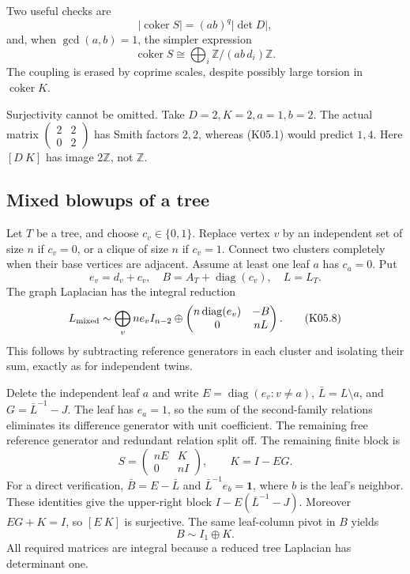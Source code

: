 \documentclass[11pt,a4paper]{article}
\theoremstyle{definition}\newtheorem{definition}[theorem]{Definition}
\theoremstyle{remark}\newtheorem{remark}[theorem]{Remark}
\newcommand{\Z}{\mathbb Z}\newcommand{\Q}{\mathbb Q}\newcommand{\F}{\mathbb F}
\DeclareMathOperator{\coker}{coker}\DeclareMathOperator{\diag}{diag}\DeclareMathOperator{\rank}{rank}
\numberwithin{equation}{section}
\begin{document}
Two useful checks are
\[
 |\coker S|=(ab)^q|\det D|,
\]
and, when $\gcd(a,b)=1$, the simpler expression
\[
 \coker S\cong\bigoplus_i\Z/(ab\,d_i)\Z.                    \tag{K05.7}
\]
The coupling is erased by coprime scales, despite possibly large torsion in $\coker K$.

Surjectivity cannot be omitted. Take $D=2,K=2,a=1,b=2$. The actual matrix $\left(\begin{smallmatrix}2&2\\0&2\end{smallmatrix}\right)$ has Smith factors $2,2$, whereas (K05.1) would predict $1,4$. Here $[D\ K]$ has image $2\Z$, not $\Z$.

\subsection{Mixed blowups of a tree}\label{K05-sec-4}
Let $T$ be a tree, and choose $c_v\in\{0,1\}$. Replace vertex $v$ by an independent set of size $n$ if $c_v=0$, or a clique of size $n$ if $c_v=1$. Connect two clusters completely when their base vertices are adjacent. Assume at least one leaf $a$ has $c_a=0$. Put
\[
 e_v=d_v+c_v,\quad B=A_T+\diag(c_v),\quad L=L_T.
\]
The graph Laplacian has the integral reduction
\[
 L_{\rm mixed}\sim\bigoplus_v ne_vI_{n-2}\oplus
 \begin{pmatrix}n\diag(e_v)&-B\\0&nL\end{pmatrix}.             \tag{K05.8}
\]
This follows by subtracting reference generators in each cluster and isolating their sum, exactly as for independent twins.

Delete the independent leaf $a$ and write $E=\diag(e_v:v\ne a)$, $\bar L=L\setminus a$, and $G=\bar L^{-1}-J$. The leaf has $e_a=1$, so the sum of the second-family relations eliminates its difference generator with unit coefficient. The remaining free reference generator and redundant relation split off. The remaining finite block is
\[
 S=\begin{pmatrix}nE&K\\0&nI\end{pmatrix},\qquad K=I-EG.     \tag{K05.9}
\]
For a direct verification, $\bar B=E-\bar L$ and $\bar L^{-1}e_b=\mathbf1$, where $b$ is the leaf's neighbor. These identities give the upper-right block $I-E(\bar L^{-1}-J)$. Moreover $EG+K=I$, so $[E\ K]$ is surjective. The same leaf-column pivot in $B$ yields
\[
 B\sim I_1\oplus K.                                         \tag{K05.10}
\]
All required matrices are integral because a reduced tree Laplacian has determinant one.
\end{document}
